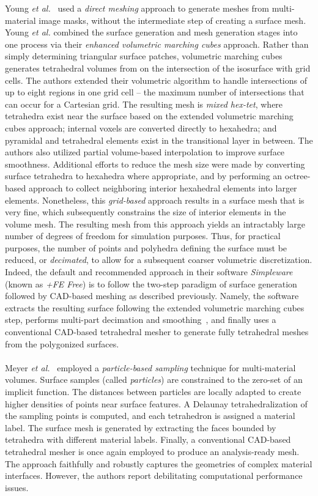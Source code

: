 %
Young \textit{et al.}~\cite{young_2008} used a \textit{direct meshing} approach to generate meshes from multi-material image masks, without the intermediate step of creating a surface mesh. Young \textit{et al.} combined the surface generation and mesh generation stages into one process via their \textit{enhanced volumetric marching cubes} approach. Rather than simply determining triangular surface patches, volumetric marching cubes generates tetrahedral volumes from on the intersection of the isosurface with grid cells. The authors extended their volumetric algorithm to handle intersections of up to eight regions in one grid cell -- the maximum number of intersections that can occur for a Cartesian grid. The resulting mesh is \textit{mixed hex-tet}, where tetrahedra exist near the surface based on the extended volumetric marching cubes approach; internal voxels are converted directly to hexahedra; and pyramidal and tetrahedral elements exist in the transitional layer in between. The authors also utilized partial volume-based interpolation to improve surface smoothness. Additional efforts to reduce the mesh size were made by converting surface tetrahedra to hexahedra where appropriate, and by performing an octree-based approach to collect neighboring interior hexahedral elements into larger elements. Nonetheless, this \textit{grid-based} approach results in a surface mesh that is very fine, which subsequently constrains the size of interior elements in the volume mesh. The resulting mesh from this approach yields an intractably large number of degrees of freedom for simulation purposes. Thus, for practical purposes, the number of points and polyhedra defining the surface must be reduced, or \textit{decimated}, to allow for a subsequent coarser volumetric discretization. Indeed, the default and recommended approach in their software \textit{Simpleware} (known as \textit{+FE Free}) is to follow the two-step paradigm of surface generation followed by CAD-based meshing as described previously. Namely, the software extracts the resulting surface following the extended volumetric marching cubes step, performs multi-part decimation and smoothing~\cite{egst}, and finally uses a conventional CAD-based tetrahedral mesher to generate fully tetrahedral meshes from the polygonized surfaces. \\ \\
%
Meyer \textit{et al.}~\cite{meyer_2008} employed a \textit{particle-based sampling} technique for multi-material volumes. Surface samples (called \textit{particles}) are constrained to the zero-set of an implicit function. The distances between particles are locally adapted to create higher densities of points near surface features. A Delaunay tetrahedralization of the sampling points is computed, and each tetrahedron is assigned a material label. The surface mesh is generated by extracting the faces bounded by tetrahedra with different material labels. Finally, a conventional CAD-based tetrahedral mesher is once again employed to produce an analysis-ready mesh. The approach faithfully and robustly captures the geometries of complex material interfaces. However, the authors report debilitating computational performance issues. \\ \\
